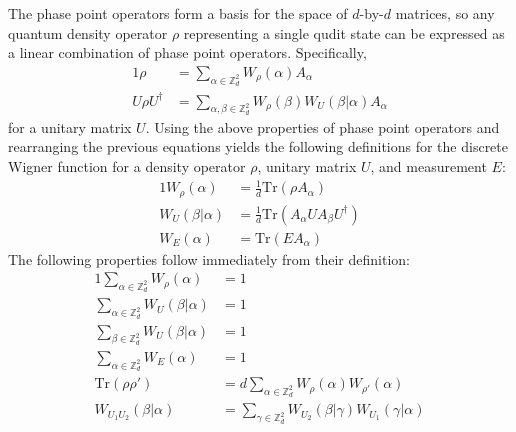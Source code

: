 \documentclass[../3Wworkreport.tex]{subfiles}
\begin{document}
\begin{appendices}
The phase point operators form a basis for the space of $d$-by-$d$ matrices, so any quantum density operator $\rho$ representing a single qudit state can be expressed as a linear combination of phase point operators. Specifically,
\begin{alignat}{1}
	\rho &= \sum\limits_{\alpha \in \mathbb{Z}_d^2} W_\rho(\alpha) A_\alpha\\
	U \rho U^\dag &= \sum\limits_{\alpha,\beta \in \mathbb{Z}_d^2} W_\rho(\beta) W_U(\beta | \alpha) A_\alpha
\end{alignat}
for a unitary matrix $U$. Using the above properties of phase point operators and rearranging the previous equations yields the following definitions for the discrete Wigner function for a density operator $\rho$, unitary matrix $U$, and measurement $E$:
\begin{alignat}{1}
	W_\rho(\alpha) &= \frac{1}{d}\text{Tr}(\rho A_\alpha)\\
	W_U(\beta | \alpha) &= \frac{1}{d}\text{Tr}(A_\alpha U A_\beta U^\dag)\\
	W_{E}(\alpha) &= \text{Tr}(E A_\alpha)
\end{alignat}
The following properties follow immediately from their definition:
\begin{alignat}{1}
	\sum\limits_{\alpha \in \mathbb{Z}_d^2} W_\rho(\alpha) &= 1\\
	\sum\limits_{\alpha \in \mathbb{Z}_d^2} W_U(\beta | \alpha) &= 1\\
	\sum\limits_{\beta \in \mathbb{Z}_d^2} W_U(\beta | \alpha) &= 1\\
	\sum\limits_{\alpha \in \mathbb{Z}_d^2} W_E(\alpha) &= 1\\
	\text{Tr}(\rho \rho') &= d \sum\limits_{\alpha \in \mathbb{Z}_d^2} W_\rho(\alpha) W_{\rho'}(\alpha)\\
	W_{U_1 U_2}(\beta | \alpha) &= \sum\limits_{\gamma \in \mathbb{Z}_d^2} W_{U_2}(\beta | \gamma) W_{U_1}(\gamma | \alpha)
\end{alignat}


\end{appendices}
\end{document}
